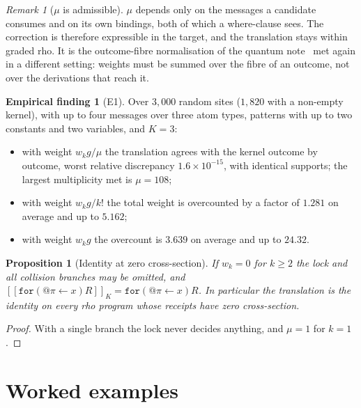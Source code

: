 \documentclass[11pt,a4paper]{article}
\theoremstyle{plain}
\newtheorem{proposition}[theorem]{Proposition}
\theoremstyle{definition}
\newtheorem{finding}[theorem]{Empirical finding}
\theoremstyle{remark}
\newtheorem{remark}[theorem]{Remark}
\newcommand{\rhoc}{\textsf{rho}}
\newcommand{\tr}[1]{[\![#1]\!]}
\newcommand{\code}[1]{\texttt{#1}}
\begin{document}
\begin{remark}[$\mu$ is admissible]\label{rem:local}
$\mu$ depends only on the messages a candidate consumes and on its own
bindings, both of which a where-clause sees. The correction is therefore
expressible in the target, and the translation stays within graded \rhoc{}.
It is the outcome-fibre normalisation of the quantum note~\cite{GWQ} met again
in a different setting: weights must be summed over the fibre of an outcome,
not over the derivations that reach it.
\end{remark}

\begin{finding}[E1]\label{find:e1}
Over $3{,}000$ random sites ($1{,}820$ with a non-empty kernel), with up to four
messages over three atom types, patterns with up to two constants and two
variables, and $K=3$:
\begin{itemize}[nosep]
\item with weight $w_kg/\mu$ the translation agrees with the kernel outcome by
outcome, worst relative discrepancy $1.6\times10^{-15}$, with identical
supports; the largest multiplicity met is $\mu=108$;
\item with weight $w_kg/k!$ the total weight is overcounted by a factor of
$1.281$ on average and up to $5.162$;
\item with weight $w_kg$ the overcount is $3.639$ on average and up to
$24.32$.
\end{itemize}
\end{finding}

\begin{proposition}[Identity at zero cross-section]\label{prop:identity}
If $w_k=0$ for $k\geq2$ the lock and all collision branches may be omitted,
and $\tr{\code{for}(@\pi\leftarrow x)R}_K = \code{for}(@\pi\leftarrow x)R$.
In particular the translation is the identity on every \rhoc{} program whose
receipts have zero cross-section.
\end{proposition}

\begin{proof}
With a single branch the lock never decides anything, and $\mu=1$ for $k=1$.
\end{proof}

\section{Worked examples}\label{sec:examples}
\end{document}
